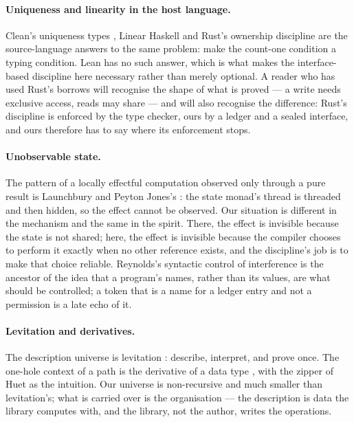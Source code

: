 \documentclass[11pt,a4paper]{article}
\theoremstyle{definition}
\theoremstyle{plain}
\begin{document}
\paragraph{Uniqueness and linearity in the host language.}
Clean's uniqueness types \cite{barensen1993uniqueness}, Linear Haskell
\cite{bernardy2018linear} and Rust's ownership discipline
\cite{jung2018rustbelt,matsakis2014rust} are the source-language answers to the
same problem: make the count-one condition a typing condition. Lean has no such
answer, which is what makes the interface-based discipline here necessary rather
than merely optional. A reader who has used Rust's borrows will recognise the
shape of what is proved --- a write needs exclusive access, reads may share ---
and will also recognise the difference: Rust's discipline is enforced by the
type checker, ours by a ledger and a sealed interface, and ours therefore has to
say where its enforcement stops.

\paragraph{Unobservable state.}
The pattern of a locally effectful computation observed only through a pure
result is Launchbury and Peyton Jones's \cite{launchbury1995state}: the state
monad's thread is threaded and then hidden, so the effect cannot be observed. Our
situation is different in the mechanism and the same in the spirit. There, the
effect is invisible because the state is not shared; here, the effect is
invisible because the compiler chooses to perform it exactly when no other
reference exists, and the discipline's job is to make that choice reliable.
Reynolds's syntactic control of interference \cite{reynolds1978sci} is the
ancestor of the idea that a program's names, rather than its values, are what
should be controlled; a token that is a name for a ledger entry and not a
permission is a late echo of it.

\paragraph{Levitation and derivatives.}
The description universe is levitation \cite{chapman2010levitation}: describe,
interpret, and prove once. The one-hole context of a path is the derivative of a
data type \cite{mcbride2001derivative}, with the zipper of Huet
\cite{huet1997zipper} as the intuition. Our universe is non-recursive and much
smaller than levitation's; what is carried over is the organisation --- the
description is data the library computes with, and the library, not the author,
writes the operations.
\end{document}
